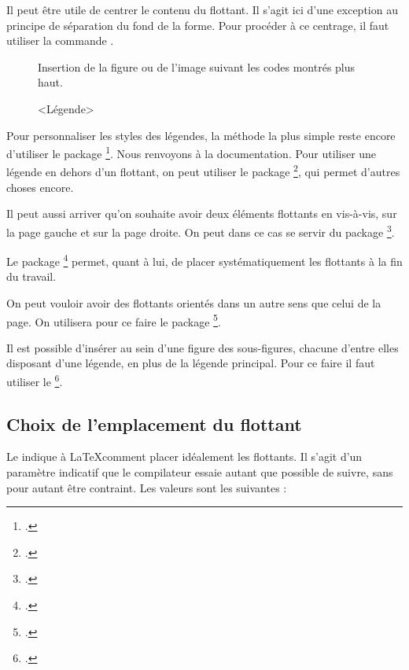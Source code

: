 \begin{plusloins}

Il peut être utile de centrer le contenu du flottant. Il s'agit ici d'une exception au principe de séparation du fond de la forme. Pour procéder à ce centrage, il faut utiliser la commande .

\begin{latexcode}
\begin{figure}[<paramètre de placement>]
    \centering
    Insertion de la figure ou de l'image suivant les codes montrés plus haut.
    \caption{<Légende>}
\end{figure} 
\end{latexcode}


Pour personnaliser les styles des légendes, la méthode la plus simple reste encore d'utiliser le package \footcite{caption}. Nous renvoyons à la documentation.
Pour utiliser une légende en dehors d'un flottant, on peut utiliser le package \footcite{ccaption}, qui permet d'autres choses encore.

Il peut aussi arriver qu'on souhaite avoir deux éléments flottants en vis-à-vis, sur la page gauche et sur la page droite. On peut dans ce cas se servir du package \footcite{dpfloat}.

Le package \footcite{endfloat} permet, quant à lui, de placer systématiquement les flottants à la fin du travail.

On peut vouloir avoir des flottants orientés dans un autre sens que celui de la page. On utilisera pour ce faire le package \footcite{rotfloat}.

Il est possible d'insérer au sein d'une figure des sous-figures, chacune d'entre elles disposant d'une légende, en plus de la légende principal.
Pour ce faire il faut utiliser le  \footcite{subcaption}.
\end{plusloins}



\subsection{Choix de l'emplacement du flottant}

Le  indique à \LaTeX comment placer idéalement les flottants. Il s'agit d'un paramètre indicatif que le compilateur essaie autant que possible de suivre, sans pour autant être contraint. Les valeurs sont les suivantes :

